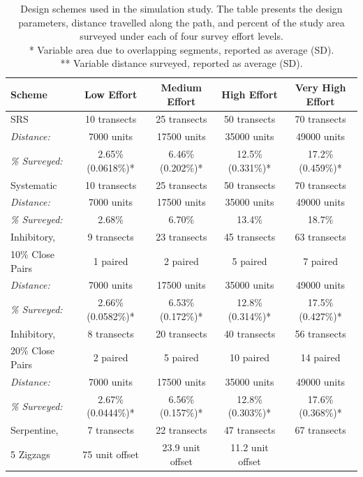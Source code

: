 \documentclass[review]{elsarticle}
\begin{document}
\begin{table}
\caption{Design schemes used in the simulation study. The table presents the
design parameters, distance travelled along the path, and percent of the study
area surveyed under each of four survey effort levels.\\
* Variable area due to overlapping segments, reported as average (SD).\\
** Variable distance surveyed, reported as average (SD).}
\label{designtable}
\tiny
\begin{tabular}{|l|c|c|c|c|}
\hline
Scheme
&
Low Effort
&
Medium Effort
&
High Effort
&
Very High Effort
\\
\hline
SRS
&
10 transects
&
25 transects
&
50 transects
&
70 transects
\\
\hfill\emph{Distance:}
&
7000 units
&
17500 units
&
35000 units
&
49000 units
\\
\hfill\emph{\% Surveyed:}
&
2.65\% (0.0618\%)*
&
6.46\% (0.202\%)*
&
12.5\% (0.331\%)*
&
17.2\% (0.459\%)*
\\
\hline
Systematic
&
10 transects
&
25 transects
&
50 transects
&
70 transects
\\
\hfill\emph{Distance:}
&
7000 units
&
17500 units
&
35000 units
&
49000 units
\\
\hfill\emph{\% Surveyed:}
&
2.68\%
&
6.70\%
&
13.4\%
&
18.7\%
\\
\hline
Inhibitory,
&
9 transects
&
23 transects
&
45 transects
&
63 transects
\\
10\% Close Pairs
&
1 paired
&
2 paired
&
5 paired
&
7 paired
\\
\hfill\emph{Distance:}
&
7000 units
&
17500 units
&
35000 units
&
49000 units
\\
\hfill\emph{\% Surveyed:}
&
2.66\% (0.0582\%)*
&
6.53\% (0.172\%)*
&
12.8\% (0.314\%)*
&
17.5\% (0.427\%)*
\\
\hline
Inhibitory,
&
8 transects
&
20 transects
&
40 transects
&
56 transects
\\
20\% Close Pairs
&
2 paired
&
5 paired
&
10 paired
&
14 paired
\\
\hfill\emph{Distance:}
&
7000 units
&
17500 units
&
35000 units
&
49000 units
\\
\hfill\emph{\% Surveyed:}
&
2.67\% (0.0444\%)*
&
6.56\% (0.157\%)*
&
12.8\% (0.303\%)*
&
17.6\% (0.368\%)*
\\
\hline
Serpentine,
&
7 transects
&
22 transects
&
47 transects
&
67 transects
\\
5 Zigzags
&
75 unit offset
&
23.9 unit offset
&
11.2 unit offset

\end{tabular}
\end{table}
\end{document}
